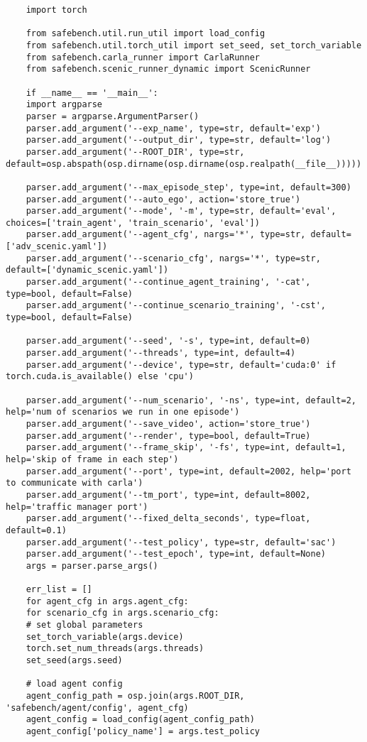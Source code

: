 \begin{enumerate}
\begin{verbatim}
	import torch 
	
	from safebench.util.run_util import load_config
	from safebench.util.torch_util import set_seed, set_torch_variable
	from safebench.carla_runner import CarlaRunner
	from safebench.scenic_runner_dynamic import ScenicRunner
	
	if __name__ == '__main__':
	import argparse
	parser = argparse.ArgumentParser()
	parser.add_argument('--exp_name', type=str, default='exp')
	parser.add_argument('--output_dir', type=str, default='log')
	parser.add_argument('--ROOT_DIR', type=str, default=osp.abspath(osp.dirname(osp.dirname(osp.realpath(__file__)))))
	
	parser.add_argument('--max_episode_step', type=int, default=300)
	parser.add_argument('--auto_ego', action='store_true')
	parser.add_argument('--mode', '-m', type=str, default='eval', choices=['train_agent', 'train_scenario', 'eval'])
	parser.add_argument('--agent_cfg', nargs='*', type=str, default=['adv_scenic.yaml'])
	parser.add_argument('--scenario_cfg', nargs='*', type=str, default=['dynamic_scenic.yaml'])
	parser.add_argument('--continue_agent_training', '-cat', type=bool, default=False)
	parser.add_argument('--continue_scenario_training', '-cst', type=bool, default=False)
	
	parser.add_argument('--seed', '-s', type=int, default=0)
	parser.add_argument('--threads', type=int, default=4)
	parser.add_argument('--device', type=str, default='cuda:0' if torch.cuda.is_available() else 'cpu')   
	
	parser.add_argument('--num_scenario', '-ns', type=int, default=2, help='num of scenarios we run in one episode')
	parser.add_argument('--save_video', action='store_true')
	parser.add_argument('--render', type=bool, default=True)
	parser.add_argument('--frame_skip', '-fs', type=int, default=1, help='skip of frame in each step')
	parser.add_argument('--port', type=int, default=2002, help='port to communicate with carla')
	parser.add_argument('--tm_port', type=int, default=8002, help='traffic manager port')
	parser.add_argument('--fixed_delta_seconds', type=float, default=0.1)
	parser.add_argument('--test_policy', type=str, default='sac')
	parser.add_argument('--test_epoch', type=int, default=None)
	args = parser.parse_args()
	
	err_list = []
	for agent_cfg in args.agent_cfg:
	for scenario_cfg in args.scenario_cfg:
	# set global parameters
	set_torch_variable(args.device)
	torch.set_num_threads(args.threads)
	set_seed(args.seed)
	
	# load agent config
	agent_config_path = osp.join(args.ROOT_DIR, 'safebench/agent/config', agent_cfg)
	agent_config = load_config(agent_config_path)
	agent_config['policy_name'] = args.test_policy
	

\end{verbatim}
\end{enumerate}

